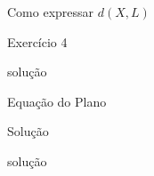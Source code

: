 \documentclass{beamer}
\begin{document}
\begin{frame}{Como expressar $d(X,L)$}
  
  
 

\end{frame}

\begin{frame}{Exercício 4}

\end{frame}

    \begin{frame}{solução}
     
    \end{frame}
   
    \begin{frame}{Equação do Plano}
     
      
    \end{frame}
    \begin{frame}{Solução}
      
    \end{frame}
\begin{frame}
  
\end{frame}
\begin{frame}{solução} 
  
\end{frame}
\end{document}
